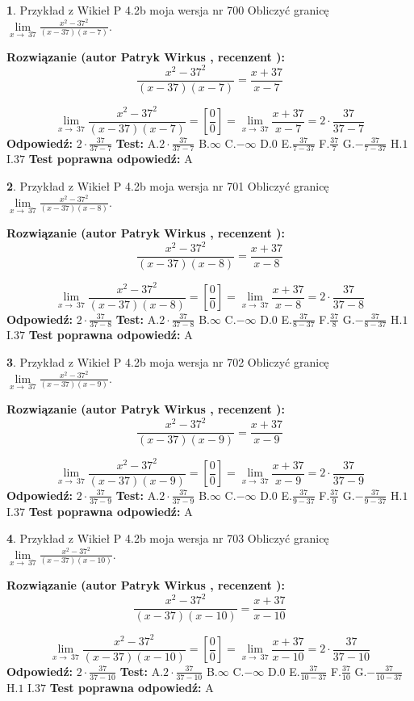 \documentclass[12pt, a4paper]{article}
\theoremstyle{definition} %
\newtheorem{zad}{}
\newcommand{\zadStart}[1]{\begin{zad}#1\newline}
\newcommand{\zadStop}{\end{zad}}
\newcommand{\rozwStart}[2]{\noindent \textbf{Rozwiązanie (autor #1 , recenzent #2): }\newline}
\newcommand{\rozwStop}{\newline}
\newcommand{\odpStart}{\noindent \textbf{Odpowiedź:}\newline}
\newcommand{\odpStop}{\newline}
\newcommand{\testStart}{\noindent \textbf{Test:}\newline}
\newcommand{\testStop}{\newline}
\newcommand{\kluczStart}{\noindent \textbf{Test poprawna odpowiedź:}\newline}
\newcommand{\kluczStop}{\newline}
\begin{document}
\zadStart{Przykład z Wikieł P 4.2b moja wersja nr 700}
Obliczyć granicę $\lim\limits_{x\to\ 37}\frac{x^{2}-37^{2}}{(x-37)(x-7)}$.
\zadStop
\rozwStart{Patryk Wirkus}{}
$$\frac{x^{2}-37^{2}}{(x-37)(x-7)}=\frac{x+37}{x-7}$$

$$\lim\limits_{x\to\ 37}\frac{x^{2}-37^{2}}{(x-37)(x-7)}=[\frac{0}{0}]=\lim\limits_{x\to\ 37}\frac{x+37}{x-7}=2 \cdot \frac{37}{37-7}$$
\rozwStop
\odpStart
$2 \cdot \frac{37}{37-7}$
\odpStop
\testStart
A.$2 \cdot \frac{37}{37-7}$
B.$\infty$
C.$-\infty$
D.$0$
E.$\frac{37}{7-37}$
F.$\frac{37}{7}$
G.$-\frac{37}{7-37}$
H.$1$
I.$37$
\testStop
\kluczStart
A
\kluczStop



\zadStart{Przykład z Wikieł P 4.2b moja wersja nr 701}
Obliczyć granicę $\lim\limits_{x\to\ 37}\frac{x^{2}-37^{2}}{(x-37)(x-8)}$.
\zadStop
\rozwStart{Patryk Wirkus}{}
$$\frac{x^{2}-37^{2}}{(x-37)(x-8)}=\frac{x+37}{x-8}$$

$$\lim\limits_{x\to\ 37}\frac{x^{2}-37^{2}}{(x-37)(x-8)}=[\frac{0}{0}]=\lim\limits_{x\to\ 37}\frac{x+37}{x-8}=2 \cdot \frac{37}{37-8}$$
\rozwStop
\odpStart
$2 \cdot \frac{37}{37-8}$
\odpStop
\testStart
A.$2 \cdot \frac{37}{37-8}$
B.$\infty$
C.$-\infty$
D.$0$
E.$\frac{37}{8-37}$
F.$\frac{37}{8}$
G.$-\frac{37}{8-37}$
H.$1$
I.$37$
\testStop
\kluczStart
A
\kluczStop



\zadStart{Przykład z Wikieł P 4.2b moja wersja nr 702}
Obliczyć granicę $\lim\limits_{x\to\ 37}\frac{x^{2}-37^{2}}{(x-37)(x-9)}$.
\zadStop
\rozwStart{Patryk Wirkus}{}
$$\frac{x^{2}-37^{2}}{(x-37)(x-9)}=\frac{x+37}{x-9}$$

$$\lim\limits_{x\to\ 37}\frac{x^{2}-37^{2}}{(x-37)(x-9)}=[\frac{0}{0}]=\lim\limits_{x\to\ 37}\frac{x+37}{x-9}=2 \cdot \frac{37}{37-9}$$
\rozwStop
\odpStart
$2 \cdot \frac{37}{37-9}$
\odpStop
\testStart
A.$2 \cdot \frac{37}{37-9}$
B.$\infty$
C.$-\infty$
D.$0$
E.$\frac{37}{9-37}$
F.$\frac{37}{9}$
G.$-\frac{37}{9-37}$
H.$1$
I.$37$
\testStop
\kluczStart
A
\kluczStop



\zadStart{Przykład z Wikieł P 4.2b moja wersja nr 703}
Obliczyć granicę $\lim\limits_{x\to\ 37}\frac{x^{2}-37^{2}}{(x-37)(x-10)}$.
\zadStop
\rozwStart{Patryk Wirkus}{}
$$\frac{x^{2}-37^{2}}{(x-37)(x-10)}=\frac{x+37}{x-10}$$

$$\lim\limits_{x\to\ 37}\frac{x^{2}-37^{2}}{(x-37)(x-10)}=[\frac{0}{0}]=\lim\limits_{x\to\ 37}\frac{x+37}{x-10}=2 \cdot \frac{37}{37-10}$$
\rozwStop
\odpStart
$2 \cdot \frac{37}{37-10}$
\odpStop
\testStart
A.$2 \cdot \frac{37}{37-10}$
B.$\infty$
C.$-\infty$
D.$0$
E.$\frac{37}{10-37}$
F.$\frac{37}{10}$
G.$-\frac{37}{10-37}$
H.$1$
I.$37$
\testStop
\kluczStart
A
\kluczStop
\end{document}
